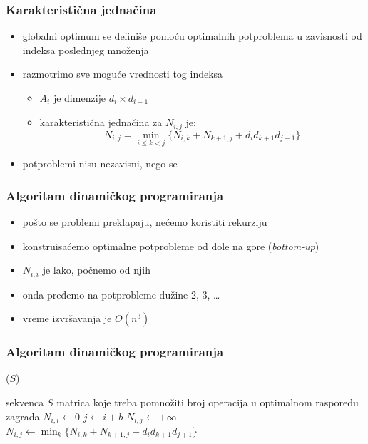\documentclass[compress]{beamer}
\begin{document}
\begin{frame}[fragile]
  \frametitle{Karakteristična jednačina}
  \begin{itemize}
    \item globalni optimum se definiše pomoću optimalnih potproblema u 
    zavisnosti od indeksa poslednjeg množenja
    \item razmotrimo sve moguće vrednosti tog indeksa
    \begin{itemize}
      \item $A_{i}$ je dimenzije $d_{i}\times d_{i+1}$
      \item karakteristična jednačina za $N_{i,j}$ je:
      $$ N_{i,j} = \min_{i\leq k<j}\{ N_{i,k} + N_{k+1,j} + d_{i} d_{k+1} d_{j+1}\}$$
    \end{itemize}
    \item potproblemi nisu nezavisni, nego se 
  \end{itemize}
\end{frame}

\begin{frame}[fragile]
  \frametitle{Algoritam dinamičkog programiranja}
  \begin{itemize}
    \item pošto se problemi preklapaju, nećemo koristiti rekurziju
    \item konstruisaćemo optimalne potprobleme od dole na gore (\textit{bottom-up})
    \item $N_{i,i}$ je lako, počnemo od njih
    \item onda pređemo na potprobleme dužine 2, 3, \ldots{}
    \item vreme izvršavanja je $O(n^3)$
  \end{itemize}
\end{frame}

\begin{frame}
  \frametitle{Algoritam dinamičkog programiranja}
  ($S$)
  \begin{algorithmic}
    \REQUIRE sekvenca $S$ matrica koje treba pomnožiti
    \ENSURE broj operacija u optimalnom rasporedu zagrada
      \STATE $N_{i,i} \leftarrow 0$
    \ENDFOR
        \STATE $j \leftarrow i+b$
        \STATE $N_{i,j} \leftarrow +\infty$
          \STATE $N_{i,j} \leftarrow \min_{k} \{ N_{i,k} + N_{k+1,j} + d_{i} d_{k+1} d_{j+1}\}$
        \ENDFOR
      \ENDFOR
    \ENDFOR
  \end{algorithmic}    
\end{frame}
\end{document}
